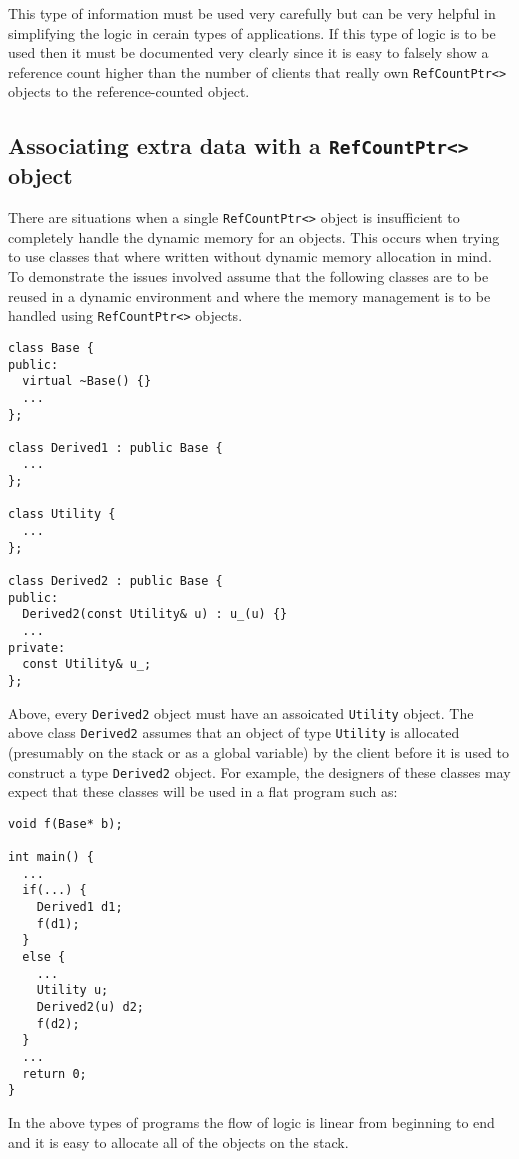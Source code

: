 This type of information must be used very carefully but can be very
helpful in simplifying the logic in cerain types of applications. If
this type of logic is to be used then it must be documented very
clearly since it is easy to falsely show a reference count higher than
the number of clients that really own {}\texttt{RefCountPtr<>} objects to
the reference-counted object.

%
\subsection{Associating extra data with a {}\texttt{RefCountPtr<>} object}
\label{rcp:sec:extra-data}
%

There are situations when a single {}\texttt{RefCountPtr<>} object is
insufficient to completely handle the dynamic memory for an objects.
This occurs when trying to use classes that where written without
dynamic memory allocation in mind.  To demonstrate the issues involved
assume that the following classes are to be reused in a dynamic
environment and where the memory management is to be handled using
{}\texttt{RefCountPtr<>} objects.
%
{\scriptsize\begin{verbatim}
class Base {
public:
  virtual ~Base() {}
  ...
};

class Derived1 : public Base {
  ...
};

class Utility {
  ...
};

class Derived2 : public Base {
public:
  Derived2(const Utility& u) : u_(u) {}
  ...
private:
  const Utility& u_;
};
\end{verbatim}}
%
\noindent{}
Above, every {}\texttt{Derived2} object must have an
assoicated {}\texttt{Utility} object.  The above class {}\texttt{Derived2}
assumes that an object of type {}\texttt{Utility} is allocated
(presumably on the stack or as a global variable) by the client before
it is used to construct a type {}\texttt{Derived2} object.  For example,
the designers of these classes may expect that these classes will be
used in a flat program such as:
%
{\scriptsize\begin{verbatim}
void f(Base* b);

int main() {
  ...
  if(...) {
    Derived1 d1;
    f(d1);
  }
  else {
    ...
    Utility u;
    Derived2(u) d2;
    f(d2);
  }
  ...
  return 0;
}
\end{verbatim}}
%
\noindent{}
In the above types of programs the flow of logic is linear
from beginning to end and it is easy to allocate all of the objects on
the stack.

